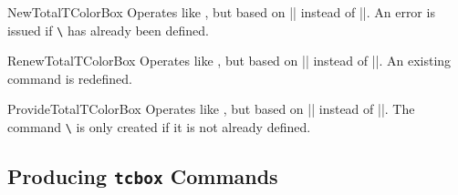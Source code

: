 \begin{docCommand}{NewTotalTColorBox}{}
  Operates like , but based on |\NewDocumentCommand| instead of |\DeclareDocumentCommand|.
  An error is issued if \texttt{\textbackslash} has already been defined.
\end{docCommand}

\begin{docCommand}{RenewTotalTColorBox}{}
  Operates like , but based on |\RenewDocumentCommand| instead of |\DeclareDocumentCommand|.
  An existing command is redefined.
\end{docCommand}

\begin{docCommand}{ProvideTotalTColorBox}{}
  Operates like , but based on |\ProvideDocumentCommand| instead of |\DeclareDocumentCommand|.
  The command \texttt{\textbackslash} is only created if it is not already defined.
\end{docCommand}


\clearpage
\subsection{Producing \texttt{tcbox} Commands}\label{subsec:xparse_tcbox}


